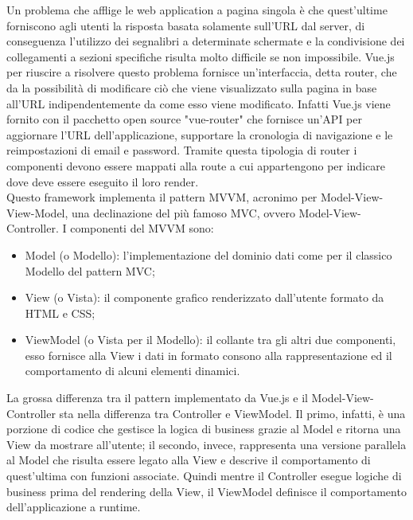 Un problema che afflige le web application a pagina singola è che quest'ultime forniscono agli utenti la risposta basata solamente sull'URL dal server, di conseguenza l'utilizzo dei segnalibri a determinate schermate e la condivisione dei collegamenti a sezioni specifiche risulta molto difficile se non impossibile. Vue.js per riuscire a risolvere questo problema fornisce un'interfaccia, detta router, che da la possibilità di modificare ciò che viene visualizzato sulla pagina in base all'URL indipendentemente da come esso viene modificato. Infatti Vue.js viene fornito con il pacchetto open source "vue-router" che fornisce un'API per aggiornare l'URL dell'applicazione, supportare la cronologia di navigazione e le reimpostazioni di email e password. Tramite questa tipologia di router i componenti devono essere mappati alla route a cui appartengono per indicare dove deve essere eseguito il loro render.\\
Questo framework implementa il pattern MVVM, acronimo per Model-View-View-Model, una declinazione del più famoso MVC, ovvero Model-View-Controller. I componenti del MVVM sono:
\begin{itemize}
	\item Model (o Modello): l'implementazione del dominio dati come per il classico Modello del pattern MVC;
	\item View (o Vista): il componente grafico renderizzato dall'utente formato da HTML e CSS;
	\item ViewModel (o Vista per il Modello): il collante tra gli altri due componenti, esso fornisce alla View i dati in formato consono alla rappresentazione ed il comportamento di alcuni elementi dinamici.
\end{itemize}
La grossa differenza tra il pattern implementato da Vue.js e il Model-View-Controller sta nella differenza tra Controller e ViewModel. Il primo, infatti, è una porzione di codice che gestisce la logica di business grazie al Model e ritorna una View da mostrare all'utente; il secondo, invece, rappresenta una versione parallela al Model che risulta essere legato alla View e descrive il comportamento di quest'ultima con funzioni associate. Quindi mentre il Controller esegue logiche di business prima del rendering della View, il ViewModel definisce il comportamento dell'applicazione a runtime.

